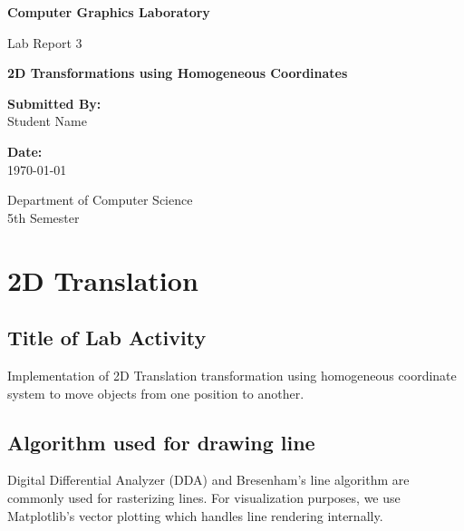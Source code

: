 \documentclass[12pt,a4paper]{article}
\begin{document}
\begin{titlepage}
    \centering
    \vspace*{1cm}
    
    \Huge
    \textbf{Computer Graphics Laboratory}
    
    \vspace{0.5cm}
    \LARGE
    Lab Report 3
    
    \vspace{1.5cm}
    
    \Large
    \textbf{2D Transformations using Homogeneous Coordinates}
    
    \vspace{2cm}
    
    \textbf{Submitted By:}\\
    \vspace{0.3cm}
    \Large
    Student Name
    
    \vspace{2cm}
    
    \textbf{Date:}\\
    \vspace{0.3cm}
    \today
    
    \vfill
    
    \large
    Department of Computer Science\\
    5th Semester
    
\end{titlepage}

\tableofcontents
\newpage

\section{2D Translation}

\subsection{Title of Lab Activity}
Implementation of 2D Translation transformation using homogeneous coordinate system to move objects from one position to another.

\subsection{Algorithm used for drawing line}
Digital Differential Analyzer (DDA) and Bresenham's line algorithm are commonly used for rasterizing lines. For visualization purposes, we use Matplotlib's vector plotting which handles line rendering internally.
\end{document}
